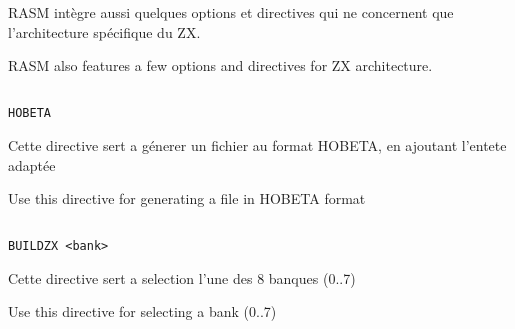 \section{}\label{PZX}

\begin{xfr}
RASM intègre aussi quelques options et directives qui ne concernent que l'architecture spécifique du ZX.
\end{xfr}

\begin{xen}
RASM also features a few options and directives for ZX architecture.
\end{xen}


\subsection{}\label{HOBETA}

\begin{verbatim}
HOBETA
\end{verbatim}

\begin{xfr}
Cette directive sert a génerer un fichier au format HOBETA, en ajoutant l'entete adaptée
\end{xfr}

\begin{xen}
Use this directive for generating a file in HOBETA format
\end{xen}

\subsection{}

\subsubsection{}\label{ZXBANK}

\begin{verbatim}
BUILDZX <bank>
\end{verbatim}

\begin{xfr}
Cette directive sert a selection l'une des 8 banques (0..7)
\end{xfr}

\begin{xen}
Use this directive for selecting a bank (0..7) 
\end{xen}

